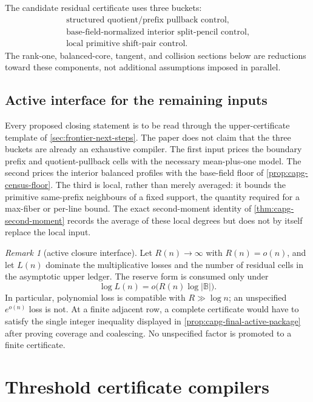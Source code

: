 \documentclass[11pt]{article}
\theoremstyle{definition}
\theoremstyle{remark}
\newtheorem{remark}[remark]{Remark}
\newcommand{\B}{\mathbb{B}}
\begin{document}
The candidate residual certificate uses three buckets:
\[
\boxed{\begin{gathered}
\text{structured quotient/prefix pullback control},\\
\text{base-field-normalized interior split-pencil control},\\
\text{local primitive shift-pair control}.
\end{gathered}}
\]
The rank-one, balanced-core, tangent, and collision sections below are reductions toward these components, not additional assumptions imposed in parallel.

\subsection{Active interface for the remaining inputs}
\label{subsec:capg-active-interface}

Every proposed closing statement is to be read through the upper-certificate template of \cref{sec:frontier-next-steps}.  The paper does not claim that the three buckets are already an exhaustive compiler.  The first input prices the boundary prefix and quotient-pullback cells with the necessary mean-plus-one model.  The second prices the interior balanced profiles with the base-field floor of \cref{prop:capg-census-floor}.  The third is local, rather than merely averaged: it bounds the primitive same-prefix neighbours of a fixed support, the quantity required for a max-fiber or per-line bound.  The exact second-moment identity of \cref{thm:capg-second-moment} records the average of these local degrees but does not by itself replace the local input.

\begin{remark}[active closure interface]\label{rem:capg-active-interface}
Let $R(n)\to\infty$ with $R(n)=o(n)$, and let $L(n)$ dominate the multiplicative losses and the number of residual cells in the asymptotic upper ledger.  The reserve form is consumed only under
\[
        \log L(n)=o\!\bigl(R(n)\log|\B|\bigr).
\]
In particular, polynomial loss is compatible with $R\gg\log n$; an unspecified $e^{o(n)}$ loss is not.  At a finite adjacent row, a complete certificate would have to satisfy the single integer inequality displayed in \cref{prop:capg-final-active-package} after proving coverage and coalescing.  No unspecified factor is promoted to a finite certificate.
\end{remark}

\section{Threshold certificate compilers}\label{sec:capf-threshold}
\end{document}
